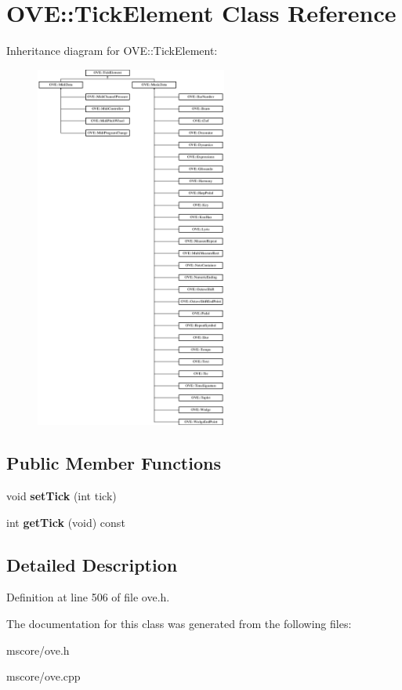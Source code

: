 \hypertarget{class_o_v_e_1_1_tick_element}{}\section{O\+VE\+:\+:Tick\+Element Class Reference}
\label{class_o_v_e_1_1_tick_element}
Inheritance diagram for O\+VE\+:\+:Tick\+Element\+:\begin{figure}[H]
\begin{center}
\leavevmode
\includegraphics[height=12.000000cm]{class_o_v_e_1_1_tick_element}
\end{center}
\end{figure}
\subsection*{Public Member Functions}
\begin{DoxyCompactItemize}
\item 
\mbox{\label{class_o_v_e_1_1_tick_element_a1180f44e11d5c89c89789a7a6666aa15}} 
void {\bfseries set\+Tick} (int tick)
\item 
\mbox{\label{class_o_v_e_1_1_tick_element_aabc17c84b039eb37808e25fbe1b0899b}} 
int {\bfseries get\+Tick} (void) const
\end{DoxyCompactItemize}


\subsection{Detailed Description}


Definition at line 506 of file ove.\+h.



The documentation for this class was generated from the following files\+:\begin{DoxyCompactItemize}
\item 
mscore/ove.\+h\item 
mscore/ove.\+cpp\end{DoxyCompactItemize}
